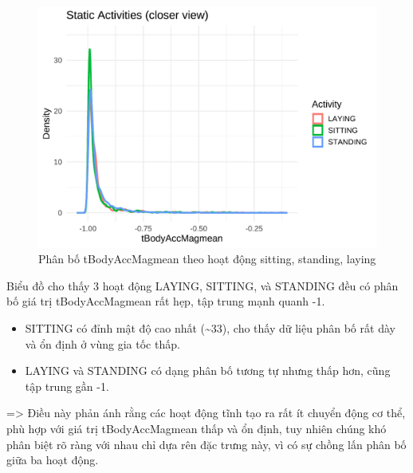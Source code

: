 \documentclass[
]{article}
\begin{document}
\begin{figure}
\centering
\includegraphics{report_files/figure-latex/unnamed-chunk-12-1.pdf}
\caption{Phân bố tBodyAccMagmean theo hoạt động sitting, standing,
laying}
\end{figure}

Biểu đồ cho thấy 3 hoạt động LAYING, SITTING, và STANDING đều có phân bố
giá trị tBodyAccMagmean rất hẹp, tập trung mạnh quanh -1.

\begin{itemize}
\item
  SITTING có đỉnh mật độ cao nhất (\textasciitilde33), cho thấy dữ liệu
  phân bố rất dày và ổn định ở vùng gia tốc thấp.
\item
  LAYING và STANDING có dạng phân bố tương tự nhưng thấp hơn, cũng tập
  trung gần -1.
\end{itemize}

=\textgreater{} Điều này phản ánh rằng các hoạt động tĩnh tạo ra rất ít
chuyển động cơ thể, phù hợp với giá trị tBodyAccMagmean thấp và ổn định,
tuy nhiên chúng khó phân biệt rõ ràng với nhau chỉ dựa rên đặc trưng
này, vì có sự chồng lấn phân bố giữa ba hoạt động.
\end{document}

